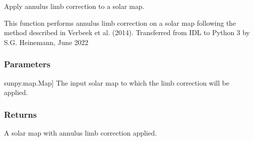 \documentclass[letterpaper,10pt,english]{sphinxmanual}
\begin{document}
\begin{fulllineitems}
\label{\detokenize{pycatch/utils/calibration:pycatch.utils.calibration.annulus_limb_correction}}
\pysigstartsignatures
{}
\pysigstopsignatures
\sphinxAtStartPar
Apply annulus limb correction to a solar map.

\sphinxAtStartPar
This function performs annulus limb correction on a solar map following the method described in Verbeek et al. (2014).
Transferred from IDL to Python 3 by S.G. Heinemann, June 2022


\subsubsection{Parameters}
\label{\detokenize{pycatch/utils/calibration:parameters}}\begin{description}
\sphinxlineitem{map}{[}sunpy.map.Map{]}
\sphinxAtStartPar
The input solar map to which the limb correction will be applied.

\end{description}


\subsubsection{Returns}
\label{\detokenize{pycatch/utils/calibration:returns}}\begin{description}
\sphinxAtStartPar
A solar map with annulus limb correction applied.

\end{description}

\end{fulllineitems}

\end{document}
